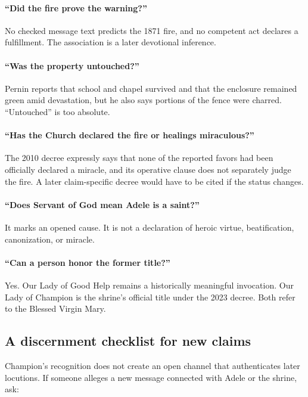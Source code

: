 \paragraph{“Did the fire prove the warning?”}
No checked message text predicts the 1871 fire, and no competent act declares a fulfillment. The association is a later devotional inference.

\paragraph{“Was the property untouched?”}
Pernin reports that school and chapel survived and that the enclosure remained green amid devastation, but he also says portions of the fence were charred. “Untouched” is too absolute.

\paragraph{“Has the Church declared the fire or healings miraculous?”}
The 2010 decree expressly says that none of the reported favors had been officially declared a miracle, and its operative clause does not separately judge the fire. A later claim-specific decree would have to be cited if the status changes.

\paragraph{“Does Servant of God mean Adele is a saint?”}
It marks an opened cause. It is not a declaration of heroic virtue, beatification, canonization, or miracle.

\paragraph{“Can a person honor the former title?”}
Yes. Our Lady of Good Help remains a historically meaningful invocation. Our Lady of Champion is the shrine's official title under the 2023 decree. Both refer to the Blessed Virgin Mary.

\subsection{A discernment checklist for new claims}

Champion's recognition does not create an open channel that authenticates later locutions. If someone alleges a new message connected with Adele or the shrine, ask:

